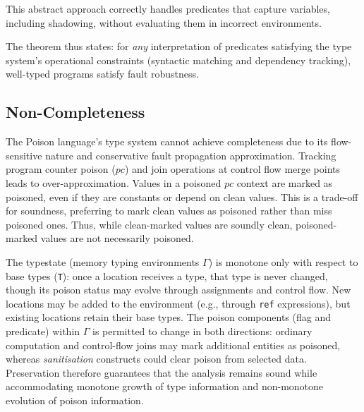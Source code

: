 \documentclass[12pt]{article}
\begin{document}
This abstract approach correctly handles predicates that capture variables,
including shadowing, without evaluating them in incorrect environments.

The theorem thus states: for \emph{any} interpretation of predicates satisfying
the type system's operational constraints (syntactic matching and dependency
tracking), well-typed programs satisfy fault robustness.

\subsection{Non-Completeness}

The Poison language's type system cannot achieve completeness due to its
flow-sensitive nature and conservative fault propagation approximation. Tracking
program counter poison ($pc$) and join operations at control flow merge points
leads to over-approximation. Values in a poisoned $pc$ context are marked as
poisoned, even if they are constants or depend on clean values. This is a
trade-off for soundness, preferring to mark clean values as poisoned rather than
miss poisoned ones. Thus, while clean-marked values are soundly clean,
poisoned-marked values are not necessarily poisoned.

The typestate (memory typing environments $\Gamma$) is monotone only with
respect to base types (\texttt{T}): once a location receives a type, that type
is never changed, though its poison status may evolve through assignments and
control flow. New locations may be added to the environment (e.g., through
\texttt{ref} expressions), but existing locations retain their base types. The
poison components (flag and predicate) within $\Gamma$ is permitted to change in
both directions: ordinary computation and control-flow joins may mark additional
entities as poisoned, whereas \emph{sanitisation} constructs could clear poison
from selected data. Preservation therefore guarantees that the analysis remains
sound while accommodating monotone growth of type information and non-monotone
evolution of poison information.





\nocite{*}

\end{document}

